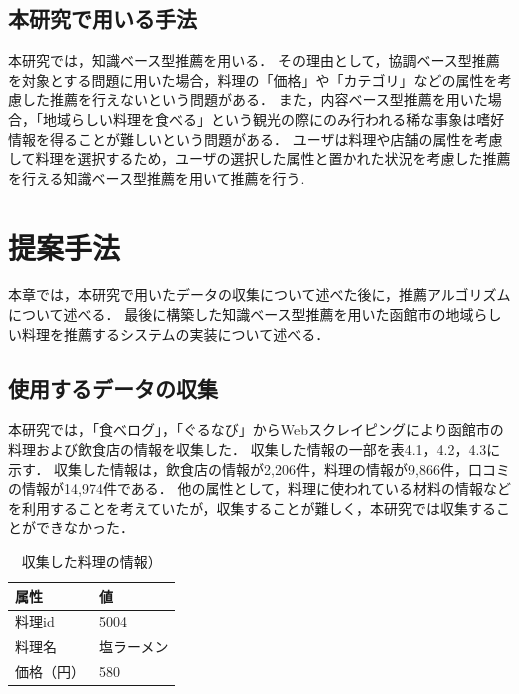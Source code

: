 \documentclass{funthesis}
\begin{document}
\section{本研究で用いる手法}
本研究では，知識ベース型推薦を用いる．
その理由として，協調ベース型推薦を対象とする問題に用いた場合，料理の「価格」や「カテゴリ」などの属性を考慮した推薦を行えないという問題がある．
また，内容ベース型推薦を用いた場合，「地域らしい料理を食べる」という観光の際にのみ行われる稀な事象は嗜好情報を得ることが難しいという問題がある．
ユーザは料理や店舗の属性を考慮して料理を選択するため，ユーザの選択した属性と置かれた状況を考慮した推薦を行える知識ベース型推薦を用いて推薦を行う.

\chapter{提案手法}
本章では，本研究で用いたデータの収集について述べた後に，推薦アルゴリズムについて述べる．
最後に構築した知識ベース型推薦を用いた函館市の地域らしい料理を推薦するシステムの実装について述べる．


\section{使用するデータの収集}
本研究では，「食べログ」\cite{4}，「ぐるなび」\cite{5}からWebスクレイピングにより函館市の料理および飲食店の情報を収集した．
収集した情報の一部を表4.1，4.2，4.3に示す．
収集した情報は，飲食店の情報が2,206件，料理の情報が9,866件，口コミの情報が14,974件である．
他の属性として，料理に使われている材料の情報などを利用することを考えていたが，収集することが難しく，本研究では収集することができなかった．

\begin{table}[htb]
  \begin{center}
  \scriptsize
    \caption{収集した料理の情報）}
    \normalsize
    \begin{tabular}{p{6cm}|p{6cm}}
    \hline
属性 & 値 \\ \hline\hline
      料理id & 5004 \\ \hline
      料理名 & 塩ラーメン \\ \hline
      価格（円） & 580 \\ \hline  \end{tabular}
  \end{center}
  \end{table}
  
\end{document}
